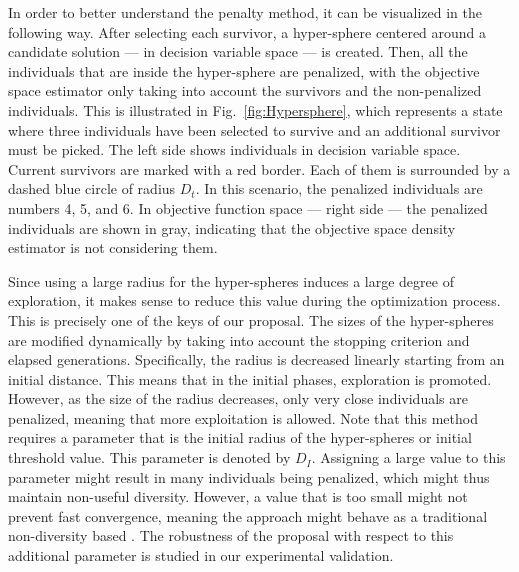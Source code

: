In order to better understand the penalty method, it can be visualized in the following way.
%
After selecting each survivor, a hyper-sphere 
centered around a candidate solution --- in decision variable space --- is created.
%
Then, all the individuals that are inside the hyper-sphere are penalized, with the objective space estimator only taking 
into account the survivors and the non-penalized individuals.
%
This is illustrated in Fig.~\ref{fig:Hypersphere}, which represents a state where three individuals have been 
selected to survive and an additional survivor must be picked.
%
The left side shows individuals in decision variable space.
%
Current survivors are marked with a red border. Each of them is surrounded by a dashed blue circle of 
radius $D_t$.
%
In this scenario, the penalized individuals are numbers 4, 5, and 6.
%
In objective function space --- right side --- the penalized individuals are shown in gray, indicating
that the objective space density estimator is not considering them.

Since using a large radius for the hyper-spheres induces a large degree of 
exploration, it makes sense to reduce this value during the optimization process.
%
This is precisely one of the keys of our proposal.
%
The sizes of the hyper-spheres are modified dynamically by taking into account the stopping 
criterion and elapsed generations.
%
Specifically, the radius is decreased linearly starting from an initial distance.
%
This means that in the initial phases, exploration is promoted.
%
However, as the size of the radius decreases, only very close individuals are penalized, meaning that more 
exploitation is allowed.
%
Note that this method requires a parameter that is the initial radius of the 
hyper-spheres or initial threshold value.
%
This parameter is denoted by $D_I$. 
%
Assigning a large value to this parameter might result in many individuals being penalized, which might thus maintain non-useful diversity.
%
However, a value that is too small might not prevent fast convergence, meaning the approach  
might behave as a traditional non-diversity based \MOEA{}.
%
The robustness of the proposal with respect to this additional parameter is studied in our experimental validation.


